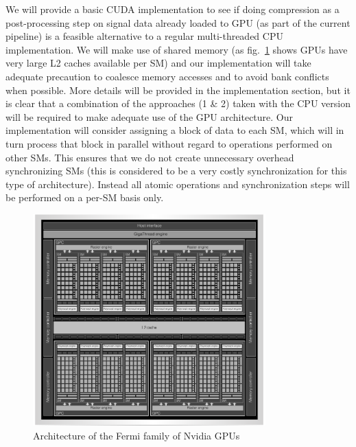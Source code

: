 We will provide a basic CUDA implementation to see if doing compression as a post-processing step on signal data already loaded to GPU (as part of the current pipeline) is a feasible alternative to a regular 
multi-threaded CPU implementation. We will make use of shared memory (as fig.~\ref{FERMI_ARCH} shows GPUs have very large L2 caches available per SM) and our implementation will take adequate precaution to 
coalesce memory accesses and to avoid bank conflicts when possible. More details will be provided in the implementation section, but it is clear that a combination of the approaches (1 \& 2) taken with the CPU version 
will be required to make adequate use of the GPU architecture. Our implementation will consider assigning a block of data to each SM, which will in turn process that block in parallel without regard to operations 
performed on other SMs. This ensures that we do not create unnecessary overhead synchronizing SMs (this is considered to be a very costly synchronization for this type of architecture). Instead all atomic operations 
and synchronization steps will be performed on a per-SM basis only.
\begin{figure}[h!]
 \centering
 \includegraphics[width=0.8\textwidth]{fermi_arch.png}
 \caption{Architecture of the Fermi family of Nvidia GPUs \cite{wittenbrink2011fermi}}
 \label{FERMI_ARCH}
\end{figure}
